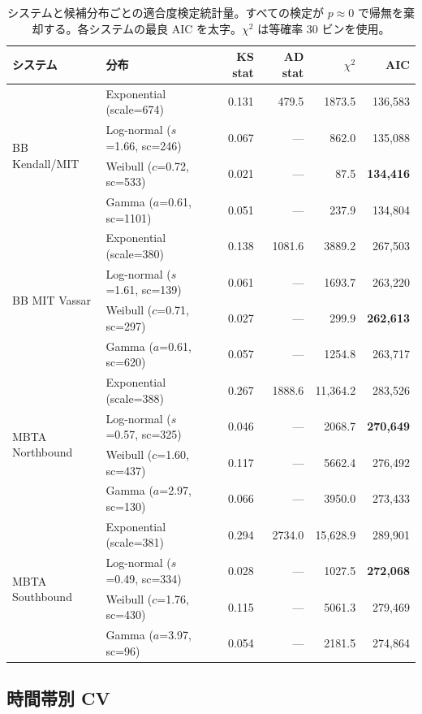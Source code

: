 \begin{table}[h]
\centering
\caption{システムと候補分布ごとの適合度検定統計量。すべての検定が $p \approx 0$ で帰無を棄却する。各システムの最良 AIC を太字。$\chi^2$ は等確率 30 ビンを使用。}
\label{tab:gof}
\footnotesize
\setlength{\tabcolsep}{4pt}
\begin{tabular}{@{}llrrrr@{}}
\toprule
システム & 分布 & KS stat & AD stat & $\chi^2$ & AIC \\
\midrule
\multirow{4}{*}{BB Kendall/MIT}
  & Exponential (scale=674) & 0.131 & 479.5 & 1873.5 & 136{,}583 \\
  & Log-normal ($s$=1.66, sc=246) & 0.067 & --- & 862.0 & 135{,}088 \\
  & Weibull ($c$=0.72, sc=533) & 0.021 & --- & 87.5 & \textbf{134{,}416} \\
  & Gamma ($a$=0.61, sc=1101) & 0.051 & --- & 237.9 & 134{,}804 \\
\midrule
\multirow{4}{*}{BB MIT Vassar}
  & Exponential (scale=380) & 0.138 & 1081.6 & 3889.2 & 267{,}503 \\
  & Log-normal ($s$=1.61, sc=139) & 0.061 & --- & 1693.7 & 263{,}220 \\
  & Weibull ($c$=0.71, sc=297) & 0.027 & --- & 299.9 & \textbf{262{,}613} \\
  & Gamma ($a$=0.61, sc=620) & 0.057 & --- & 1254.8 & 263{,}717 \\
\midrule
\multirow{4}{*}{MBTA Northbound}
  & Exponential (scale=388) & 0.267 & 1888.6 & 11{,}364.2 & 283{,}526 \\
  & Log-normal ($s$=0.57, sc=325) & 0.046 & --- & 2068.7 & \textbf{270{,}649} \\
  & Weibull ($c$=1.60, sc=437) & 0.117 & --- & 5662.4 & 276{,}492 \\
  & Gamma ($a$=2.97, sc=130) & 0.066 & --- & 3950.0 & 273{,}433 \\
\midrule
\multirow{4}{*}{MBTA Southbound}
  & Exponential (scale=381) & 0.294 & 2734.0 & 15{,}628.9 & 289{,}901 \\
  & Log-normal ($s$=0.49, sc=334) & 0.028 & --- & 1027.5 & \textbf{272{,}068} \\
  & Weibull ($c$=1.76, sc=430) & 0.115 & --- & 5061.3 & 279{,}469 \\
  & Gamma ($a$=3.97, sc=96) & 0.054 & --- & 2181.5 & 274{,}864 \\
\bottomrule
\end{tabular}
\end{table}

\subsection{時間帯別 CV}\label{app:hour}

